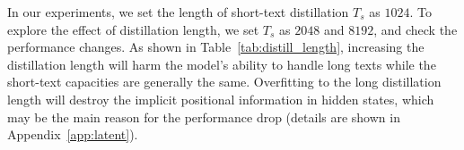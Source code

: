        

\begin{table}[htb]
    \centering
    \caption{Results with different distillation layers.}
    \label{tab:distill_granularity}
\end{table}




 In our experiments, we set the length of short-text distillation $T_s$ as $1024$. To explore the effect of distillation length, we set $T_s$ as $2048$ and $8192$, and check the performance changes. As shown in Table~\ref{tab:distill_length}, increasing the distillation length will harm the model's ability to handle long texts while the short-text capacities are generally the same. 
Overfitting to the long distillation length will destroy the implicit positional information in hidden states, which may be the main reason for the performance drop (details are shown in Appendix~\ref{app:latent}). 




